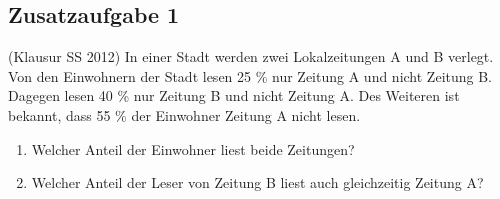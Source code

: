 \subsection*{Zusatzaufgabe 1}

(Klausur SS 2012) In einer Stadt werden zwei Lokalzeitungen A und B verlegt. Von den Einwohnern der Stadt lesen 25 \% nur Zeitung A und nicht Zeitung B. Dagegen lesen 40 \% nur Zeitung B und nicht Zeitung A. Des Weiteren ist bekannt, dass 55 \% der Einwohner Zeitung A nicht lesen.


\begin{enumerate} [label=\alph*)]
\item Welcher Anteil der Einwohner liest beide Zeitungen?
\vspace{6cm}
\item Welcher Anteil der Leser von Zeitung B liest auch gleichzeitig Zeitung A?

\end{enumerate}